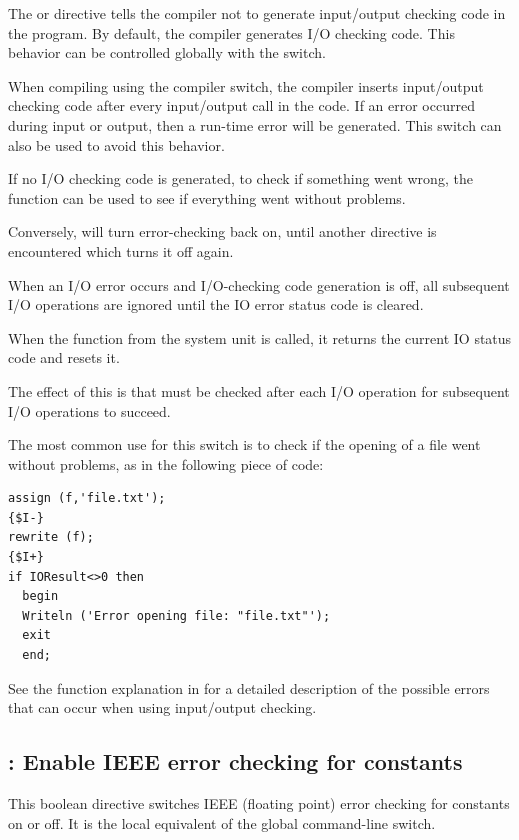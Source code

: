The  or  directive tells the compiler
not to generate input/output checking code in the program. By default, the
compiler generates I/O checking code. This behavior can be controlled
globally with the  switch.

When compiling using the  compiler switch, the \fpc compiler inserts
input/output checking code after every input/output call in the code.
If an error occurred during input or output, then a run-time error will
be generated. This switch can also be used to avoid this behavior.

If no I/O checking code is generated, to check if something went wrong, 
the  function can be used to see if everything went without 
problems.

Conversely,  will turn error-checking back on, until another
directive is encountered which turns it off again.

\begin{remark}
When an I/O error occurs and I/O-checking code generation is off, all subsequent 
I/O operations are ignored until the IO error status code is cleared. 

When the  function from the system unit is called, it returns the
current IO status code and resets it.

The effect of this is that  must be checked after each I/O
operation for subsequent I/O operations to succeed.
\end{remark}

The most common use for this switch is to check if the opening of a file
went without problems, as in the following piece of code:
\begin{verbatim}
assign (f,'file.txt');
{$I-}
rewrite (f);
{$I+}
if IOResult<>0 then
  begin
  Writeln ('Error opening file: "file.txt"');
  exit
  end;
\end{verbatim}
See the  function explanation in  for a
detailed description of the possible errors that can occur when using
input/output checking.

\subsection{ : Enable IEEE error checking for constants }
This boolean directive switches IEEE (floating point) error checking for constants on
or off. It is the local equivalent of the global  command-line switch.

